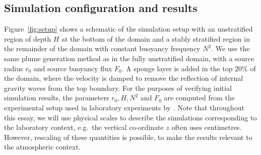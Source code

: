\documentclass[a4paper]{article}
\begin{document}
\subsection{Simulation configuration and results}
\label{sec:dynamics}
Figure~\ref{fig:setup} shows a schematic of the simulation setup with an unstratified region of depth $H$ at
the bottom of the domain and a stably stratified region in the remainder of the domain with constant buoyancy
frequency $N^2$. We use the same plume generation method as in the fully unstratified domain, with a source
radius $r_0$ and source buoyancy flux $F_0$. A sponge layer is added in the top $20\%$ of the domain, where
the velocity is damped to remove the reflection of internal gravity waves from the top boundary.  For the
purposes of verifying initial simulation results, the parameters $r_0, H, N^2$ and $F_0$ are computed from the
experimental setup used in laboratory experiments by \citet{ansong2010}. Note that throughout this essay, we
will use physical scales to describe the simulations corresponding to the laboratory context, e.g.\ the
vertical co-ordinate $z$ often uses centimetres. However, rescaling of these quantities is possible, to make
the results relevant to the atmospheric context.
\end{document}
